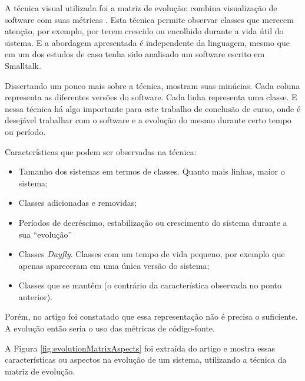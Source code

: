 A técnica visual utilizada foi a matriz de evolução: combina visualização de
software com suas métricas \cite{lanza2001evolution}. Esta técnica permite
observar classes que merecem atenção, por exemplo, por terem crescido ou
encolhido durante a vida útil do sistema. E a abordagem apresentada é
independente da linguagem, mesmo que em um dos estudos de caso tenha sido
analisado um software escrito em Smalltalk.

Dissertando um pouco mais sobre a técnica, 
mostram suas minúcias. Cada coluna representa as diferentes versões do
software. Cada linha representa uma classe. E nessa técnica há algo importante
para este trabalho de conclusão de curso, onde é desejável trabalhar com o
software e a evolução do mesmo durante certo tempo ou período.

Características que podem ser observadas na técnica:

\begin{itemize}
  \item Tamanho dos sistemas em termos de classes. Quanto mais linhas, maior o
  sistema;
  \item Classes adicionadas e removidas;
  \item Períodos de decréscimo, estabilização ou crescimento do sistema durante a
  sua ``evolução''
  \item Classes \textit{Dayfly}. Classes com um tempo de vida pequeno, por
  exemplo que apenas apareceram em uma única versão do sistema;
  \item Classes que se mantêm (o contrário da característica observada no ponto
  anterior).
\end{itemize}

Porém, no artigo foi constatado que essa representação não é precisa o suficiente.
A evolução então seria o uso das métricas de código-fonte.

A Figura \ref{fig:evolutionMatrixAspects} foi extraída do artigo e mostra essas
características ou aspectos na evolução de um sistema, utilizando a técnica da
matriz de evolução.

